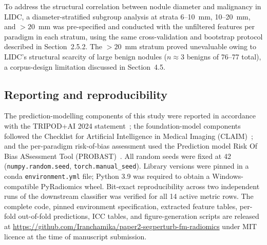 To address the structural correlation between nodule diameter and malignancy in LIDC, a diameter-stratified subgroup analysis at strata 6--10~mm, 10--20~mm, and $>20$~mm was pre-specified and conducted with the unfiltered features per paradigm in each stratum, using the same cross-validation and bootstrap protocol described in Section~2.5.2. The $>20$~mm stratum proved unevaluable owing to LIDC's structural scarcity of large benign nodules ($n \approx 3$ benigns of 76--77 total), a corpus-design limitation discussed in Section~4.5.

\subsection{Reporting and reproducibility}

The prediction-modelling components of this study were reported in accordance with the TRIPOD+AI 2024 statement~\cite{collins2024tripod}; the foundation-model components followed the Checklist for Artificial Intelligence in Medical Imaging (CLAIM)~\cite{mongan2020claim}; and the per-paradigm risk-of-bias assessment used the Prediction model Risk Of Bias ASsessment Tool (PROBAST)~\cite{wolff2019probast}. All random seeds were fixed at 42 (\texttt{numpy.random.seed}, \texttt{torch.manual\_seed}). Library versions were pinned in a conda \texttt{environment.yml} file; Python 3.9 was required to obtain a Windows-compatible PyRadiomics wheel. Bit-exact reproducibility across two independent runs of the downstream classifier was verified for all 14 active metric rows. The complete code, pinned environment specification, extracted feature tables, per-fold out-of-fold predictions, ICC tables, and figure-generation scripts are released at \url{https://github.com/Iranchamika/paper2-segperturb-fm-radiomics} under MIT licence at the time of manuscript submission.
